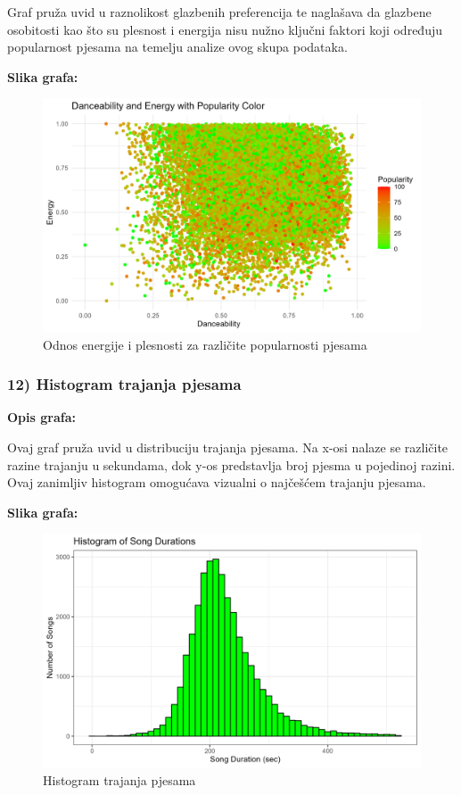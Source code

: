 	Graf pruža uvid u raznolikost glazbenih preferencija te naglašava da glazbene osobitosti kao što su plesnost i energija nisu nužno ključni faktori koji određuju popularnost pjesama na temelju analize ovog skupa podataka.
	
	\textbf{Slika grafa:}
	\begin{figure}[H]
		\includegraphics[scale=0.9]{slike/Dance-Energy-popularity.png}
		\centering
		\caption{ Odnos energije i plesnosti za različite popularnosti pjesama}
		
	\end{figure}


	\subsubsection{12) Histogram trajanja pjesama}
    
    \textbf{Opis grafa:}
    
Ovaj graf pruža uvid u distribuciju trajanja pjesama. Na x-osi nalaze se različite razine trajanju u sekundama, dok y-os predstavlja broj pjesma u pojedinoj razini. Ovaj zanimljiv histogram omogućava vizualni o najčešćem trajanju pjesama.
    

    \textbf{Slika grafa:}
    \begin{figure}[H]
        \includegraphics[scale=0.9]{slike/Histogram of song durations.png}
        \centering
        \caption{Histogram trajanja pjesama}
        
    \end{figure}
    
